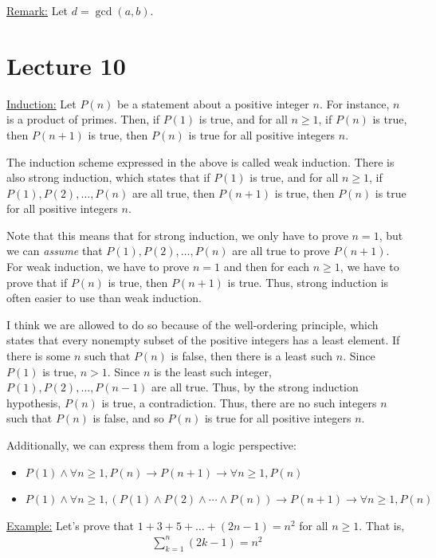 \documentclass{article}
\newenvironment{aside}{\begin{siderules}\setlength{\leftskip}{0.3cm}}{\end{siderules}\setlength{\leftskip}{0pt}}
\begin{document}
\underline{Remark:} Let $d=\gcd(a,b)$. 

\section{Lecture 10}

\underline{Induction:} Let $P(n)$ be a statement about a positive integer $n$. For instance, $n$ is a product of primes. Then, if $P(1)$ is true, and for all $n\geq 1$, if $P(n)$ is true, then $P(n+1)$ is true, then $P(n)$ is true for all positive integers $n$.

The induction scheme expressed in the above is called weak induction. There is also strong induction, which states that if $P(1)$ is true, and for all $n\geq 1$, if $P(1), P(2), \ldots, P(n)$ are all true, then $P(n+1)$ is true, then $P(n)$ is true for all positive integers $n$.

Note that this means that for strong induction, we only have to prove $n=1$, but we can \textit{assume} that $P(1), P(2), \ldots, P(n)$ are all true to prove $P(n+1)$. For weak induction, we have to prove $n=1$ and then for each $n\geq 1$, we have to prove that if $P(n)$ is true, then $P(n+1)$ is true. Thus, strong induction is often easier to use than weak induction. 

\begin{aside}
I think we are allowed to do so because of the well-ordering principle, which states that every nonempty subset of the positive integers has a least element. If there is some $n$ such that $P(n)$ is false, then there is a least such $n$. Since $P(1)$ is true, $n>1$. Since $n$ is the least such integer, $P(1), P(2), \ldots, P(n-1)$ are all true. Thus, by the strong induction hypothesis, $P(n)$ is true, a contradiction. Thus, there are no such integers $n$ such that $P(n)$ is false, and so $P(n)$ is true for all positive integers $n$.
\end{aside}

Additionally, we can express them from a logic perspective:\begin{itemize}
    \item $P(1) \wedge \forall n\geq 1, P(n)\rightarrow P(n+1) \rightarrow \forall n\geq 1, P(n)$
    \item $P(1) \wedge \forall n\geq 1, (P(1)\wedge P(2)\wedge \cdots \wedge P(n))\rightarrow P(n+1) \rightarrow \forall n\geq 1, P(n)$
\end{itemize}

\underline{Example:} Let's prove that $1+3+5+\dots+(2n-1)=n^2$ for all $n\geq 1$. That is, \begin{align*}
    \sum_{k=1}^n (2k-1) = n^2
\end{align*}
\end{document}
